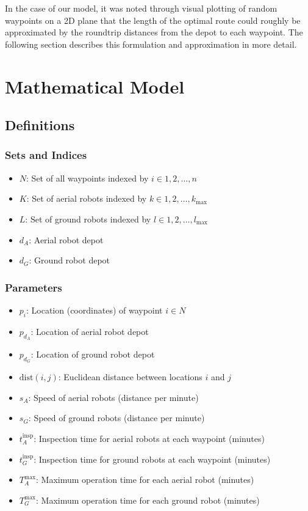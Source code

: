 \documentclass{article}
\begin{document}
		In the case of our model, it was noted through visual plotting of random waypoints on a 2D plane that the length of the optimal route could roughly be approximated by the roundtrip distances from the depot to each waypoint. 
		The following section describes this formulation and approximation in more detail.

	\section{Mathematical Model}

		\subsection{Definitions}


			\subsubsection{Sets and Indices}

				\begin{itemize}
				\item $N$: Set of all waypoints indexed by $i \in {1, 2, \ldots, n}$
				\item $K$: Set of aerial robots indexed by $k \in {1, 2, \ldots, k_{\max}}$
				\item $L$: Set of ground robots indexed by $l \in {1, 2, \ldots, l_{\max}}$
				\item $d_A$: Aerial robot depot
				\item $d_G$: Ground robot depot
				\end{itemize}

			\subsubsection{Parameters}

				\begin{itemize}
				\item $p_i$: Location (coordinates) of waypoint $i \in N$
				\item $p_{d_A}$: Location of aerial robot depot
				\item $p_{d_G}$: Location of ground robot depot
				\item $\text{dist}(i,j)$: Euclidean distance between locations $i$ and $j$
				\item $s_A$: Speed of aerial robots (distance per minute)
				\item $s_G$: Speed of ground robots (distance per minute)
				\item $t_A^{\text{insp}}$: Inspection time for aerial robots at each waypoint (minutes)
				\item $t_G^{\text{insp}}$: Inspection time for ground robots at each waypoint (minutes)
				\item $T_A^{\max}$: Maximum operation time for each aerial robot (minutes)
				\item $T_G^{\max}$: Maximum operation time for each ground robot (minutes)
				\end{itemize}
\end{document}
